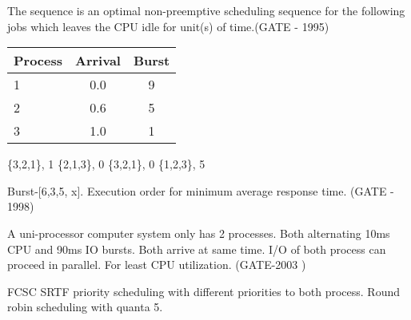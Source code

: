 \begin{questyle}

  \question  The sequence \fillin[] is an optimal non-preemptive scheduling sequence for the following jobs
             which leaves the CPU idle for \fillin[] unit(s) of time.(GATE - 1995)

  \begin{myTableStyle}
    \begin{center}
    \begin{tabular}{ |l|c|c| } \hline
        Process &   Arrival & Burst    \\ \hline
        1      &   0.0       & 9         \\ \hline
        2      &   0.6       & 5         \\ \hline
        3      &   1.0       & 1         \\ \hline
    \end{tabular}
    \end{center}
  \end{myTableStyle}
  \vspace{0.08in}
  \begin{oneparchoices}
    \CorrectChoice \{3,2,1\}, 1
    \choice \{2,1,3\}, 0
    \choice \{3,2,1\}, 0
    \choice \{1,2,3\}, 5
  \end{oneparchoices}

  \end{questyle}





\begin{questyle}

  \question  Burst-[6,3,5, x]. Execution order for minimum average response time. (GATE - 1998)


  \end{questyle}





\begin{questyle}

  \question  A uni-processor computer system only has 2 processes. Both alternating 10ms CPU and 90ms IO bursts.
             Both arrive at same time. I/O of both process can proceed in parallel. For least CPU utilization. (GATE-2003 )

  \begin{choices}
    \choice FCSC
    \choice SRTF
    \choice priority scheduling with different priorities to both process.
    \CorrectChoice Round robin scheduling with quanta 5.
  \end{choices}


  \end{questyle}



